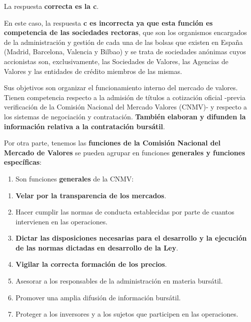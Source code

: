 \documentclass[
  letterpaper,
  DIV=11,
  numbers=noendperiod]{scrreprt}
\providecommand{\tightlist}{%
  \setlength{\itemsep}{0pt}\setlength{\parskip}{0pt}}\usepackage{longtable,booktabs,array}
\begin{document}
\begin{tcolorbox}[enhanced jigsaw, left=2mm, opacityback=0, colback=white, breakable, arc=.35mm, bottomrule=.15mm, rightrule=.15mm, toprule=.15mm, leftrule=.75mm, colframe=quarto-callout-tip-color-frame]
\begin{minipage}[t]{5.5mm}
\textcolor{quarto-callout-tip-color}{\faLightbulb}
\end{minipage}%
\begin{minipage}[t]{\textwidth - 5.5mm}

La respuesta \textbf{correcta es la c}.

En este caso, la respuesta \textbf{c es incorrecta ya que esta función
es competencia de las sociedades rectoras}, que son los organismos
encargados de la administración y gestión de cada una de las bolsas que
existen en España (Madrid, Barcelona, Valencia y Bilbao) y se trata de
sociedades anónimas cuyos accionistas son, exclusivamente, las
Sociedades de Valores, las Agencias de Valores y las entidades de
crédito miembros de las mismas.

Sus objetivos son organizar el funcionamiento interno del mercado de
valores. Tienen competencia respecto a la admisión de títulos a
cotización oficial -previa verificación de la Comisión Nacional del
Mercado Valores (CNMV)- y respecto a los sistemas de negociación y
contratación. \textbf{También elaboran y difunden la información
relativa a la contratación bursátil}.

Por otra parte, tenemos las \textbf{funciones de la Comisión Nacional
del Mercado de Valores} se pueden agrupar en funciones \textbf{generales
y funciones específicas}:

\begin{enumerate}
\def\labelenumi{\arabic{enumi}.}
\tightlist
\item
  Son funciones \textbf{generales} de la CNMV:
\end{enumerate}

\begin{enumerate}
\def\labelenumi{\alph{enumi})}
\item
  \textbf{Velar por la transparencia de los mercados}.
\item
  Hacer cumplir las normas de conducta establecidas por parte de cuantos
  intervienen en las operaciones.
\item
  \textbf{Dictar las disposiciones necesarias para el desarrollo y la
  ejecución de las normas dictadas en desarrollo de la Ley}.
\item
  \textbf{Vigilar la correcta formación de los precios}.
\item
  Asesorar a los responsables de la administración en materia bursátil.
\item
  Promover una amplia difusión de información bursátil.
\item
  Proteger a los inversores y a los sujetos que participen en las
  operaciones.
\end{enumerate}


\end{minipage}
\end{tcolorbox}
\end{document}
